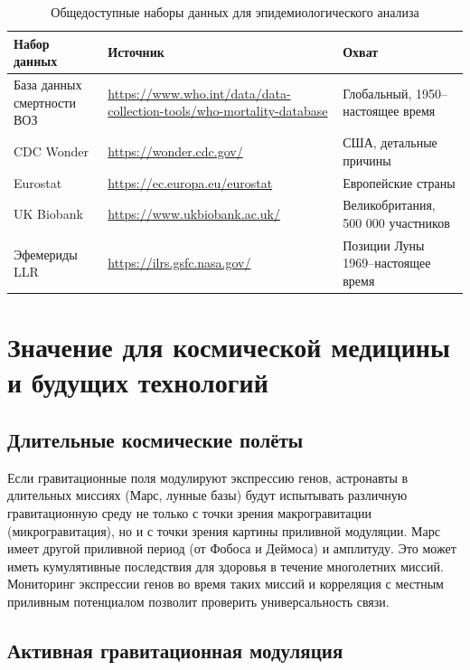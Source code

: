 \documentclass[12pt,a4paper]{article}
\theoremstyle{remark}
\begin{document}
	\begin{table}[htbp]
		\centering
		\caption{Общедоступные наборы данных для эпидемиологического анализа}
		\label{tab:data-sources}
		\small
		\begin{tabular}{p{3.2cm}p{6.5cm}p{2.8cm}}
			\toprule
			\textbf{Набор данных} & \textbf{Источник} & \textbf{Охват} \\
			\midrule
			База данных смертности ВОЗ & 
			\url{https://www.who.int/data/data-collection-tools/who-mortality-database} & 
			Глобальный, 1950–настоящее время \\
			CDC Wonder & 
			\url{https://wonder.cdc.gov/} & 
			США, детальные причины \\
			Eurostat & 
			\url{https://ec.europa.eu/eurostat} & 
			Европейские страны \\
			UK Biobank & 
			\url{https://www.ukbiobank.ac.uk/} & 
			Великобритания, 500 000 участников \\
			Эфемериды LLR & 
			\url{https://ilrs.gsfc.nasa.gov/} & 
			Позиции Луны 1969–настоящее время \\
			\bottomrule
		\end{tabular}
	\end{table}
	
	\section{Значение для космической медицины и будущих технологий}
	\label{sec:applications}
	
	\subsection{Длительные космические полёты}
	
	Если гравитационные поля модулируют экспрессию генов, астронавты в длительных миссиях (Марс, лунные базы) будут испытывать различную гравитационную среду не только с точки зрения макрогравитации (микрогравитация), но и с точки зрения картины приливной модуляции. Марс имеет другой приливной период (от Фобоса и Деймоса) и амплитуду. Это может иметь кумулятивные последствия для здоровья в течение многолетних миссий. Мониторинг экспрессии генов во время таких миссий и корреляция с местным приливным потенциалом позволит проверить универсальность связи.
	
	\subsection{Активная гравитационная модуляция}
	
\end{document}
